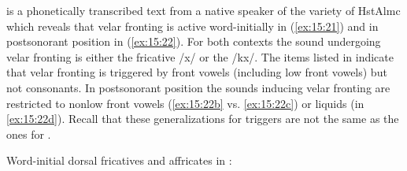 {\citet{Gröger1914b} is a phonetically transcribed text from a native speaker of the  variety of HstAlmc which reveals that velar fronting is active word-initially in (\ref{ex:15:21}) and in postsonorant position in (\ref{ex:15:22}). For both contexts the sound undergoing velar fronting is either the fricative /x/ or the  /kx/. The items listed in  indicate that velar fronting is triggered by front vowels (including low front vowels) but not consonants. In postsonorant position the sounds inducing velar fronting are restricted to nonlow front vowels (\ref{ex:15:22b} vs. \ref{ex:15:22c}) or liquids (in \ref{ex:15:22d}). Recall that these generalizations for triggers are not the same as the ones for .\largerpage[2]


\ea%
\label{ex:15:21}Word-initial dorsal fricatives and affricates in :

}
